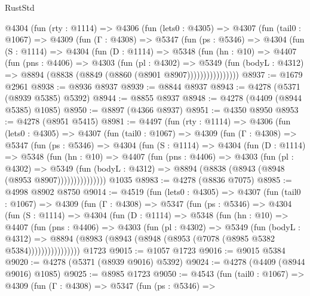 \begin{lexlean}{RustStd}
\begin{coremodule}
    @4304
      (fun (rty : @1114) =>
      @4306
        (fun (lets0 : @4305) =>
        @4307
          (fun (tail0 : @1067) =>
          @4309
            (fun (Γ : @4308) =>
            @5347
              (fun (ps : @5346) =>
              @4304
                (fun (S : @1114) =>
                @4304
                  (fun (D : @1114) =>
                  @5348
                    (fun (hn : @10) =>
                    @4407
                      (fun (pns : @4406) =>
                      @4303
                        (fun (pl : @4302) =>
                        @5349
                          (fun (bodyL : @4312) =>
                          @8894 (@8838 (@8849 (@8860 (@8901 @8907))))))))))))))))
@8937 := @1679 @2961
@8938 := @8936 @8937
@8939 := @8844 @8937
@8943 := @4278 (@5371 (@8939 @5385) @5392)
@8944 := @8855 @8937
@8948 := @4278 (@4409 (@8944 @5385) @1085)
@8950 := @8897 (@4366 @8937)
@8951 := @4350 @8950
@8953 := @4278 (@8951 @5415)
@8981 := @4497
    (fun (rty : @1114) =>
    @4306
      (fun (lets0 : @4305) =>
      @4307
        (fun (tail0 : @1067) =>
        @4309
          (fun (Γ : @4308) =>
          @5347
            (fun (ps : @5346) =>
            @4304
              (fun (S : @1114) =>
              @4304
                (fun (D : @1114) =>
                @5348
                  (fun (hn : @10) =>
                  @4407
                    (fun (pns : @4406) =>
                    @4303
                      (fun (pl : @4302) =>
                      @5349
                        (fun (bodyL : @4312) =>
                        @8894 (@8838 (@8943 (@8948 (@8953 @8907)))))))))))))))
    @1035
@8983 := @4278 (@8836 @7075)
@8985 := @4998 @8902 @8750
@9014 := @4519
    (fun (lets0 : @4305) =>
    @4307
      (fun (tail0 : @1067) =>
      @4309
        (fun (Γ : @4308) =>
        @5347
          (fun (ps : @5346) =>
          @4304
            (fun (S : @1114) =>
            @4304
              (fun (D : @1114) =>
              @5348
                (fun (hn : @10) =>
                @4407
                  (fun (pns : @4406) =>
                  @4303
                    (fun (pl : @4302) =>
                    @5349
                      (fun (bodyL : @4312) =>
                      @8894 (@8983 (@8943 (@8948 (@8953 (@7078 (@8985 @5382 @5384))))))))))))))))
    @1723
@9015 := @1057 @1723
@9016 := @9015 @5384
@9020 := @4278 (@5371 (@8939 @9016) @5392)
@9024 := @4278 (@4409 (@8944 @9016) @1085)
@9025 := @8985 @1723
@9050 := @4543
    (fun (tail0 : @1067) =>
    @4309
      (fun (Γ : @4308) =>
      @5347
        (fun (ps : @5346) =>

\end{coremodule}
\end{lexlean}
